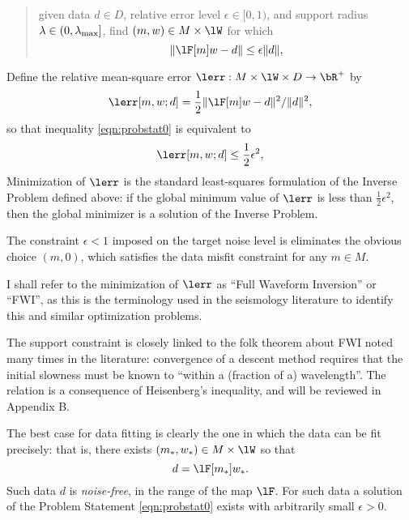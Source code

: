 \begin{quote}
  given data $d \in D$, relative error level $\epsilon \in
  [0,1)$, and support radius $\lambda \in (0, \lambda_{\rm
    max}]$, find $(m,w) \in M \times \lW$ for which 
\begin{equation}
  \label{eqn:probstat0}  \|\lF[m]w-d\| \le \epsilon\|d\|,
\end{equation}
\end{quote}

Define the relative mean-square error $\lerr: M \times \lW \times D
\rightarrow \bR^+$ by
\begin{equation}
  \label{eqn:redms}
  \lerr[m,w;d]=\frac{1}{2}\|\lF[m]w-d\|^2/\|d\|^2,
\end{equation}
so that inequality \ref{eqn:probstat0} is equivalent to
\begin{equation}
  \label{eqn:probstat1}
  \lerr[m,w;d] \le \frac{1}{2}\epsilon^2,
\end{equation}
Minimization of $\lerr$ is the standard least-squares formulation of
the Inverse Problem defined above: if the global minimum value of
$\lerr$ is less than $\frac{1}{2}\epsilon^2$, then the global
minimizer is a solution of the Inverse Problem.

 The constraint $\epsilon < 1$ imposed on the
target noise level is eliminates the obvious choice $(m,0)$, which
satisfies the data misfit constraint for any $m \in M$. 

 I shall refer to the minimization of $\lerr$ as
``Full Waveform Inversion'' or ``FWI'', as this is the
terminology used in the seismology literature to identify this and
similar optimization problems.

 The support constraint is closely linked to the
folk theorem about FWI noted many times in the literature: convergence
of a descent method requires that the initial slowness must be known
to ``within a (fraction of a) wavelength''. The relation is a
consequence of Heisenberg's inequality, and will be reviewed in
Appendix B.

The best case for data fitting
is clearly the one in which the data can be fit precisely: that is,
there exists $(m_*,w_*) \in M\times \lW$ so that
\begin{equation}
  \label{eqn:defdatanonoise}
  d=\lF[m_*]w_*.
\end{equation}
Such data $d$ is {\em noise-free}, in the range of the map $\lF$. For
such data a solution of the Problem Statement \ref{eqn:probstat0}
exists with arbitrarily small $\epsilon>0$.


